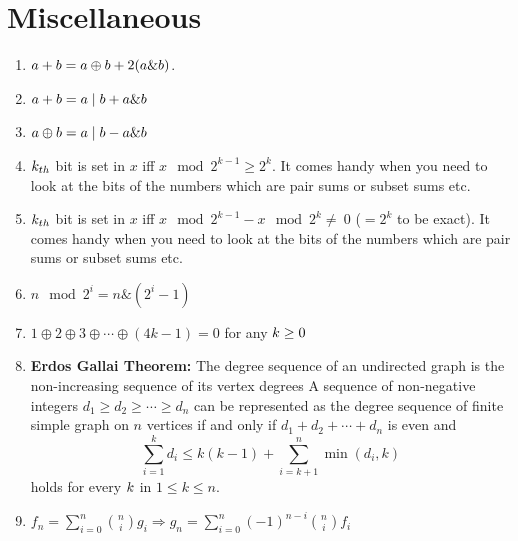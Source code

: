 \section{Miscellaneous}
\begin{enumerate}[resume]
    \item $\displaystyle \displaystyle a+b = a \oplus b +2(a \& b)$.
    \item $\displaystyle \displaystyle a + b = a \mid b + a \& b$
    \item $\displaystyle \displaystyle a \oplus b = a\mid b - a \& b$
    \item $\displaystyle \displaystyle k_{th}$ bit is set in $\displaystyle x$ iff $\displaystyle x \mod 2^{k - 1}\geq 2^k$. It comes handy when you need to look at the bits of the numbers which are pair sums or subset sums etc.
    \item $\displaystyle \displaystyle k_{th}$ bit is set in $\displaystyle x$ iff $\displaystyle x \mod 2^{k - 1} - x \mod 2^k \neq\ 0$ ($ = 2^k$ to be exact). It comes handy when you need to look at the bits of the numbers which are pair sums or subset sums etc.
    \item $n \mod 2^i = n \& (2^i - 1)$
    \item $\displaystyle 1\oplus 2 \oplus 3 \oplus \cdots \oplus (4k - 1) = 0$ for any $\displaystyle \displaystyle k \ge 0$
    \item \textbf{Erdos Gallai Theorem:}
          The degree sequence of an undirected graph is the non-increasing sequence of its vertex degrees
          A sequence of non-negative integers $d_1 \geq d_2 \geq \cdots \geq d_n$ can be represented as the degree sequence of finite simple graph on $n$ vertices if and only if $d_1 + d_2 + \cdots + d_n$ is even and
          \[\displaystyle \sum_{i = 1}^k {d_i \leq k(k - 1)} + \sum_{i = k + 1}^n \min(d_i, k)\]
          holds for every $\displaystyle \displaystyle k$ in $\displaystyle 1 \leq k \leq n$.
    \item $f_n = \sum_{i=0}^{n} \binom{n}{i} g_i \Rightarrow g_n = \sum_{i=0}^{n} (-1)^{n-i} \binom{n}{i} f_i$
\end{enumerate}
